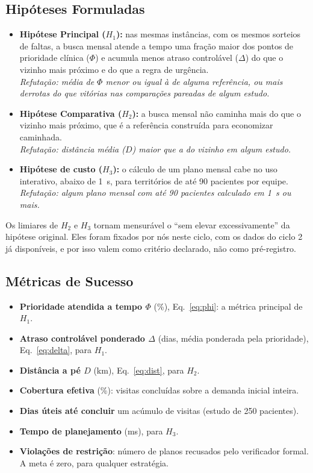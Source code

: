 \documentclass[11pt,a4paper]{article}
\begin{document}
\subsection{Hipóteses Formuladas}
\begin{itemize}
    \item \textbf{Hipótese Principal ($H_1$):} nas mesmas instâncias, com os mesmos sorteios de faltas, a busca mensal atende a tempo uma fração maior dos pontos de prioridade clínica ($\Phi$) e acumula menos atraso controlável ($\Delta$) do que o vizinho mais próximo e do que a regra de urgência. \\
    \textit{Refutação: média de $\Phi$ menor ou igual à de alguma referência, ou mais derrotas do que vitórias nas comparações pareadas de algum estudo.}
    \item \textbf{Hipótese Comparativa ($H_2$):} a busca mensal não caminha mais do que o vizinho mais próximo, que é a referência construída para economizar caminhada. \\
    \textit{Refutação: distância média ($D$) maior que a do vizinho em algum estudo.}
    \item \textbf{Hipótese de custo ($H_3$):} o cálculo de um plano mensal cabe no uso interativo, abaixo de 1~s, para territórios de até 90 pacientes por equipe. \\
    \textit{Refutação: algum plano mensal com até 90 pacientes calculado em 1~s ou mais.}
\end{itemize}
Os limiares de $H_2$ e $H_3$ tornam mensurável o ``sem elevar excessivamente'' da hipótese original. Eles foram fixados por nós neste ciclo, com os dados do ciclo 2 já disponíveis, e por isso valem como critério declarado, não como pré-registro.

\subsection{Métricas de Sucesso}
\begin{itemize}
    \item \textbf{Prioridade atendida a tempo $\Phi$} (\%), Eq.~\eqref{eq:phi}: a métrica principal de $H_1$.
    \item \textbf{Atraso controlável ponderado $\Delta$} (dias, média ponderada pela prioridade), Eq.~\eqref{eq:delta}, para $H_1$.
    \item \textbf{Distância a pé $D$} (km), Eq.~\eqref{eq:dist}, para $H_2$.
    \item \textbf{Cobertura efetiva} (\%): visitas concluídas sobre a demanda inicial inteira.
    \item \textbf{Dias úteis até concluir} um acúmulo de visitas (estudo de 250 pacientes).
    \item \textbf{Tempo de planejamento} (ms), para $H_3$.
    \item \textbf{Violações de restrição}: número de planos recusados pelo verificador formal. A meta é zero, para qualquer estratégia.
\end{itemize}
\end{document}
